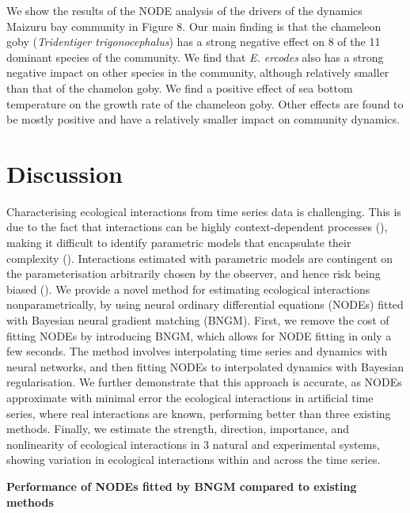 \documentclass[11pt, oneside]{article}
\begin{document}
We show the results of the NODE analysis of the drivers of the dynamics Maizuru bay community in Figure 8.
Our main finding is that the chameleon goby (\textit{Tridentiger trigonocephalus}) has a strong negative effect on 8 of the 11 dominant species of the community. 
We find that \textit{E. ercodes} also has a strong negative impact on other species in the community, although relatively smaller than that of the chamelon goby.
We find a positive effect of sea bottom temperature on the growth rate of the chameleon goby.
Other effects are found to be mostly positive and have a relatively smaller impact on community dynamics.

\section{Discussion}

Characterising ecological interactions from time series data is challenging.
This is due to the fact that interactions can be highly context-dependent processes (\cite{Song2021}), making it difficult to identify parametric models that encapsulate their complexity (\cite{Wood2001}).
Interactions estimated with parametric models are contingent on the parameterisation arbitrarily chosen by the observer, and hence risk being biased (\cite{Wood2001,Adamson2013}).
We provide a novel method for estimating ecological interactions nonparametrically, by using neural ordinary differential equations (NODEs) fitted with Bayesian neural gradient matching (BNGM). 
First, we remove the cost of fitting NODEs by introducing BNGM, which allows for NODE fitting in only a few seconds. 
The method involves interpolating time series and dynamics with neural networks, and then fitting NODEs to interpolated dynamics with Bayesian regularisation.
We further demonstrate that this approach is accurate, as NODEs approximate with minimal error the ecological interactions in artificial time series, where real interactions are known, performing better than three existing methods. 
Finally, we estimate the strength, direction, importance, and nonlinearity of ecological interactions in 3 natural and experimental systems, showing variation in ecological interactions within and across the time series.

\textbf{Performance of NODEs fitted by BNGM compared to existing methods}
\end{document}
